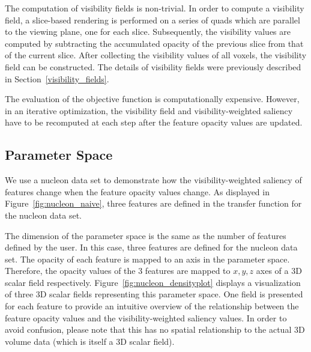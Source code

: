 The computation of visibility fields is non-trivial. In order to compute a visibility field, a slice-based rendering is performed on a series of quads which are parallel to the viewing plane, one for each slice.
Subsequently, the visibility values are computed by subtracting the accumulated opacity of the previous slice from that of the current slice. After collecting the visibility values of all voxels, the visibility field can be constructed. The details of visibility fields were previously described in Section~\ref{visibility_fields}.

The evaluation of the objective function is computationally expensive. However, in an iterative optimization, the visibility field and visibility-weighted saliency have to be recomputed at each step after the feature opacity values are updated.

\subsection{Parameter Space}
We use a nucleon data set \cite{website:Voreen_datasets_2013} to demonstrate how the visibility-weighted saliency of features change when the feature opacity values change. As displayed in Figure~\ref{fig:nucleon_naive}, three features are defined in the transfer function for the nucleon data set.

The dimension of the parameter space is the same as the number of features defined by the user. In this case, three features are defined for the nucleon data set. The opacity of each feature is mapped to an axis in the parameter space. Therefore, the opacity values of the 3 features are mapped to $ x, y, z $ axes of a 3D scalar field respectively.
Figure~\ref{fig:nucleon_densityplot} displays a visualization of three 3D scalar fields representing this parameter space.
One field is presented for each feature to provide an intuitive overview of the relationship between the feature opacity values and the visibility-weighted saliency values. In order to avoid confusion, please note that this has no spatial relationship to the actual 3D volume data (which is itself a 3D scalar field).

